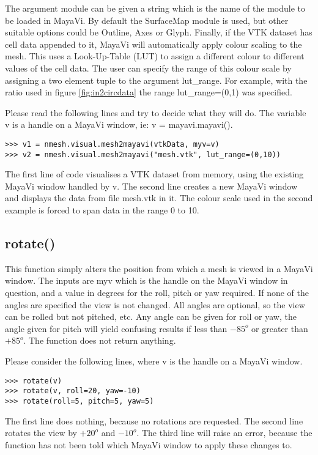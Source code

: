 The argument {\ttfamily module} can be given a string which is the name of the module to be loaded in MayaVi. By default the SurfaceMap module is used, but other suitable options could be Outline, Axes or Glyph. Finally, if the VTK dataset has cell data appended to it, MayaVi will automatically apply colour scaling to the mesh. This uses a Look-Up-Table (LUT) to assign a different colour to different values of the cell data. The user can specify the range of this colour scale by assigning a two element tuple to the argument {\ttfamily lut\_range}. For example, with the ratio used in figure \ref{fig:in2circdata} the range {\ttfamily lut\_range=(0,1)} was specified.

Please read the following lines and try to decide what they will do. The variable {\ttfamily v} is a handle on a MayaVi window, ie: {\ttfamily v = mayavi.mayavi()}.
\begin{lstlisting}[basicstyle=\small\ttfamily]
>>> v1 = nmesh.visual.mesh2mayavi(vtkData, myv=v)
>>> v2 = nmesh.visual.mesh2mayavi("mesh.vtk", lut_range=(0,10))
\end{lstlisting}
The first line of code visualises a VTK dataset from memory, using the existing MayaVi window handled by {\ttfamily v}. The second line creates a new MayaVi window and displays the data from file {\ttfamily mesh.vtk} in it. The colour scale used in the second example is forced to span data in the range 0 to 10.


\subsection{{\ttfamily rotate()}}
This function simply alters the position from which a mesh is viewed in a MayaVi window. The inputs are {\ttfamily myv} which is the handle on the MayaVi window in question, and a value in degrees for the roll, pitch or yaw required. If none of the angles are specified the view is not changed. All angles are optional, so the view can be rolled but not pitched, etc. Any angle can be given for roll or yaw, the angle given for pitch will yield confusing results if less than $-85^{o}$ or greater than $+85^{o}$. The function does not return anything.

Please consider the following lines, where v is the handle on a MayaVi window.
\begin{lstlisting}[basicstyle=\small\ttfamily]
>>> rotate(v)
>>> rotate(v, roll=20, yaw=-10)
>>> rotate(roll=5, pitch=5, yaw=5)
\end{lstlisting}
The first line does nothing, because no rotations are requested. The second line rotates the view by $+20^{o}$ and $-10^{o}$. The third line will raise an error, because the function has not been told which MayaVi window to apply these changes to.

